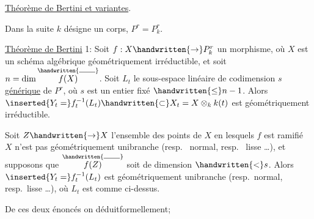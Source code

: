 
\uline{Théorème de Bertini et variantes}.

Dans la suite $k$ désigne un corps, $P^r=P^r_k$.

\uline{Théorème de Bertini} 1: Soit $f:X\handwritten{\rightarrow}P^r_k$ un morphisme, où $X$ est un schéma algébrique géométriquement irréductible, et soit $n=\dim\overset{\handwritten{\rule{1.9em}{.4pt}}}{f(X)}$. Soit $L_t$ le sous-espace linéaire de codimension $s$ \uline{générique} de $P^r$, où $s$ est un entier fixé $\handwritten{\leq}n-1$. Alors $\inserted{Y_t=}f_t^{-1}(L_t)\handwritten{\subset}X_t=X\otimes_k k(t)$ est géométriquement irréductible.

  Soit $Z\handwritten{\rightarrow}X$  l'ensemble des points de $X$ en lesquels  $f$ est  ramifié   $X$ n'est pas géométriquement unibranche (resp.\  normal, resp.\  lisse \ldots),  et supposons que $\overset{\handwritten{\rule{1.9em}{.4pt}}}{f(Z)}$ soit de dimension $\handwritten{<}s$. Alors $\inserted{Y_t=}f_t^{-1}(L_t)$ est géométriquement unibranche (resp.\ normal, resp.\ lisse \ldots), où $L_t$ est comme ci-dessus.

De ces deux énoncés on déduit\handwritten{/}formellement;

